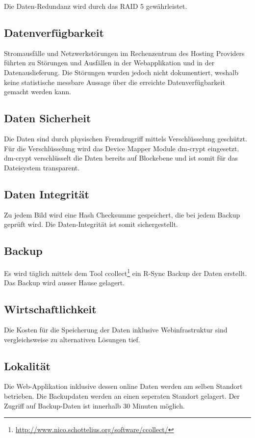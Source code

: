 Die Daten-Redundanz wird durch das RAID 5 gewährleistet.

\subsection{Datenverfügbarkeit}
Stromausfälle und Netzwerkstörungen im Rechenzentrum des Hosting Providers führten zu Störungen und Ausfällen in der Webapplikation und in der Datenauslieferung. Die Störungen wurden jedoch nicht dokumentiert, weshalb keine statistische messbare Aussage über die erreichte Datenverfügbarkeit gemacht werden kann.

\subsection{Daten Sicherheit}
Die Daten sind durch physischen Fremdzugriff mittels Verschlüsselung geschützt. Für die Verschlüsselung wird das Device Mapper Module dm-crypt eingesetzt. dm-crypt verschlüsselt die Daten bereits auf Blockebene und ist somit für das Dateisystem transparent.

\subsection{Daten Integrität}
Zu jedem Bild wird eine Hash Checksumme gespeichert, die bei jedem Backup geprüft wird. Die Daten-Integrität ist somit sichergestellt.

\subsection{Backup}
Es wird täglich mittels dem Tool ccollect\footnote{\url{http://www.nico.schottelius.org/software/ccollect/}} ein R-Sync Backup der Daten erstellt. Das Backup wird ausser Hause gelagert.

\subsection{Wirtschaftlichkeit}
Die Kosten für die Speicherung der Daten inklusive Webinfrastruktur sind vergleichsweise zu alternativen Lösungen tief.

\subsection{Lokalität}

Die Web-Applikation inklusive dessen online Daten werden am selben Standort betrieben. Die Backupdaten werden an einen seperaten Standort gelagert. Der Zugriff auf Backup-Daten ist innerhalb 30 Minuten möglich.

